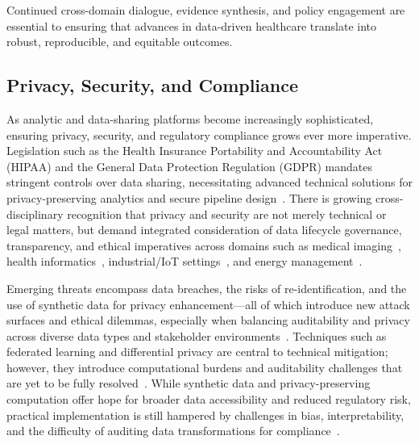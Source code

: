 \documentclass[sigconf]{acmart}
\begin{document}
Continued cross-domain dialogue, evidence synthesis, and policy engagement are essential to ensuring that advances in data-driven healthcare translate into robust, reproducible, and equitable outcomes.

\subsection{Privacy, Security, and Compliance}

As analytic and data-sharing platforms become increasingly sophisticated, ensuring privacy, security, and regulatory compliance grows ever more imperative. Legislation such as the Health Insurance Portability and Accountability Act (HIPAA) and the General Data Protection Regulation (GDPR) mandates stringent controls over data sharing, necessitating advanced technical solutions for privacy-preserving analytics and secure pipeline design~\cite{ref2, ref4, ref5, ref6, ref7, ref8, ref9, ref10, ref24, ref25, ref28, ref30, ref31, ref33, ref34, ref35, ref36, ref41, ref43, ref46, ref50, ref54, ref51, ref61, ref62, ref63, ref64, ref65, ref70, ref71, ref72, ref75, ref76, ref77, ref78, ref79, ref82, ref83, ref84, ref90, ref91, ref106}. There is growing cross-disciplinary recognition that privacy and security are not merely technical or legal matters, but demand integrated consideration of data lifecycle governance, transparency, and ethical imperatives across domains such as medical imaging~\cite{ref54, ref50, ref46, ref51}, health informatics~\cite{ref84, ref82, ref83}, industrial/IoT settings~\cite{ref106, ref71, ref72}, and energy management~\cite{ref71}. 

Emerging threats encompass data breaches, the risks of re-identification, and the use of synthetic data for privacy enhancement---all of which introduce new attack surfaces and ethical dilemmas, especially when balancing auditability and privacy across diverse data types and stakeholder environments~\cite{ref91, ref83, ref84}. Techniques such as federated learning and differential privacy are central to technical mitigation; however, they introduce computational burdens and auditability challenges that are yet to be fully resolved~\cite{ref5, ref6, ref7, ref54, ref65, ref71, ref72, ref75, ref77, ref78, ref79, ref84, ref90, ref91, ref106}. While synthetic data and privacy-preserving computation offer hope for broader data accessibility and reduced regulatory risk, practical implementation is still hampered by challenges in bias, interpretability, and the difficulty of auditing data transformations for compliance~\cite{ref91}.
\end{document}

